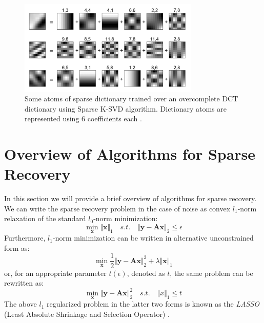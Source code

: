 \documentclass[journal]{IEEEtran}
\begin{document}
\begin{figure}
	\includegraphics[width=8.6cm]{figures/double_sparsity}
	
	\caption{Some atoms of sparse dictionary trained over an overcomplete DCT dictionary using Sparse K-SVD algorithm. Dictionary atoms are represented using 6 coefficients each \cite{Rubinstein2010}.}
	
	\label{fig:double_sparsity}
\end{figure}

\section{Overview of Algorithms for Sparse Recovery} \label{sec:4}


In this section we will provide a brief overview of algorithms for sparse recovery. We can write the sparse recovery problem in the case of noise as convex $l_1$-norm relaxation of the standard $l_0$-norm minimization:
%
\begin{equation} \label{eq:l0_minimization_noisy}
	\min_{\boldsymbol{x}}\Vert\boldsymbol{x}\Vert_1 \quad s.t. \quad \Vert \boldsymbol{y}-\boldsymbol{A}\boldsymbol{x}\Vert_2\leq \epsilon
\end{equation}
Furthermore, $l_1$-norm minimization can be written in alternative unconstrained form as:
%
\begin{equation} \label{eq:lasso_unconstrained}
	\min_{\boldsymbol{x}}\frac{1}{2}\Vert \boldsymbol{y}-\boldsymbol{A}\boldsymbol{x}\Vert_2^2+\lambda\Vert\boldsymbol{x}\Vert_1
\end{equation}
%
or, for an appropriate parameter $t(\epsilon)$, denoted as $t$, the same problem can be rewritten as:
\begin{equation} \label{eq:lasso_constrained}
	\min_{\boldsymbol{x}} \Vert \boldsymbol{y}-\boldsymbol{A}\boldsymbol{x}\Vert_2^2 \quad s.t. \quad \Vert x\Vert_1 \leq t
\end{equation}
%
The above $l_1$ regularized problem in the latter two forms is known as the \textit{LASSO} (Least Absolute Shrinkage and Selection Operator) \cite{tibshirani1996regression}.
\end{document}
